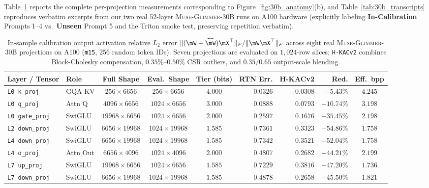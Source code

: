 \documentclass[10pt]{article} %
\newcommand{\glimmer}{\textsc{Muse-Glimmer-30B}}
\begin{document}
Table~\ref{tab:m15_hessian} reports the complete per-projection measurements corresponding to Figure~\ref{fig:30b_anatomy}(b), and Table~\ref{tab:30b_transcripts} reproduces verbatim excerpts from our two real 52-layer \glimmer{} runs on A100 hardware (explicitly labeling \textbf{In-Calibration} Prompts 1--4 vs.\ \textbf{Unseen} Prompt 5 and the Triton smoke test, preserving repetition verbatim).

\begin{table}[htbp]
\caption{In-sample calibration output activation relative $L_2$ error $\|(\mW - \widehat{\mW})\mX^\top\|_F / \|\mW\mX^\top\|_F$ across eight real \glimmer{} projections on A100 (\texttt{m15}, 256 random token IDs). Seven projections are evaluated on $1{,}024$-row slices; \texttt{H-KACv2} combines Block-Cholesky compensation, $0.35\%$--$0.50\%$ CSR outliers, and $0.35/0.65$ output-scale blending.}
\label{tab:m15_hessian}
\begin{center}
\scriptsize\setlength{\tabcolsep}{2.8pt}
\begin{tabular}{l l c c c r r r c}
\toprule
\textbf{Layer / Tensor} & \textbf{Role} & \textbf{Full Shape} & \textbf{Eval.\ Shape} & \textbf{Tier (bits)} & \textbf{RTN Err.} & \textbf{H-KACv2} & \textbf{Red.} & \textbf{Eff.\ bpp} \\
\midrule
\texttt{L0 k\_proj} & GQA KV & $256 \times 6656$ & $256 \times 6656$ & $4.000$ & $0.0326$ & $0.0308$ & $-5.43\%$ & $4.245$ \\
\texttt{L0 q\_proj} & Attn Q & $4096 \times 6656$ & $1024 \times 6656$ & $3.000$ & $0.0888$ & $0.0793$ & $-10.74\%$ & $3.198$ \\
\texttt{L0 gate\_proj} & SwiGLU & $19968 \times 6656$ & $1024 \times 6656$ & $2.000$ & $0.2597$ & $0.1676$ & $-35.45\%$ & $2.198$ \\
\texttt{L2 down\_proj} & SwiGLU & $6656 \times 19968$ & $1024 \times 19968$ & $1.585$ & $0.7361$ & $0.3323$ & $\mathbf{-54.86\%}$ & $1.758$ \\
\texttt{L4 down\_proj} & SwiGLU & $6656 \times 19968$ & $1024 \times 19968$ & $1.585$ & $0.7342$ & $0.3521$ & $-52.04\%$ & $1.758$ \\
\texttt{L4 o\_proj} & Attn Out & $6656 \times 4096$ & $1024 \times 4096$ & $2.000$ & $0.4807$ & $0.2682$ & $-44.21\%$ & $2.199$ \\
\texttt{L7 up\_proj} & SwiGLU & $19968 \times 6656$ & $1024 \times 6656$ & $1.585$ & $0.7229$ & $0.3816$ & $-47.20\%$ & $1.736$ \\
\texttt{L7 down\_proj} & SwiGLU & $6656 \times 19968$ & $1024 \times 19968$ & $1.585$ & $0.4878$ & $0.2658$ & $-45.50\%$ & $1.821$ \\

\end{tabular}
\end{center}
\end{table}
\end{document}
